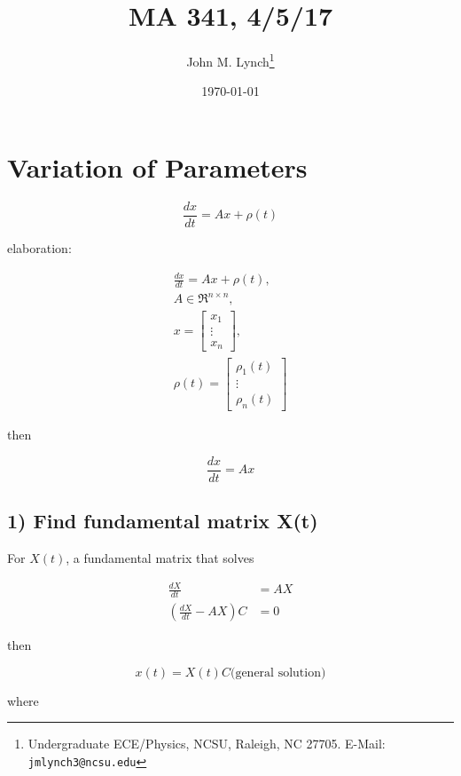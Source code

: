 \documentclass[twocolumn,draft]{article}
\title{MA 341, 4/5/17}
\author{John M. Lynch\footnote{Undergraduate ECE/Physics, NCSU, Raleigh, NC 27705. E-Mail: \texttt{jmlynch3@ncsu.edu}}}
\date{\today}
\begin{document}
  \maketitle
  
  \section*{Variation of Parameters}
  
  \begin{equation}
  	\frac{dx}{dt} = Ax + \rho(t)
  \end{equation}
  
  elaboration:
  
  \begin{align*}
  	\frac{dx}{dt} = Ax + \rho(t), \\
	A\in\Re^{n\times n}, \\
	x = \begin{bmatrix}
		x_{1} \\
		\vdots \\
		x_{n}
	\end{bmatrix}, \\
	\rho(t) = \begin{bmatrix}
				\rho_{1}(t) \\
				\vdots \\
				\rho_{n}(t)
			  \end{bmatrix}
  \end{align*}
  
  then
  
  \begin{equation}
  	\frac{dx}{dt} = Ax
  \end{equation}
  
  \subsection*{1) Find fundamental matrix X(t)} For $X(t)$, a fundamental matrix that solves
  
  \begin{align}
  	\frac{dX}{dt} &= AX \\
	(\frac{dX}{dt} - AX)C &= 0
  \end{align}
  
  then
  
  \begin{equation}
  	x(t) = X(t)C \text{(general solution)}
  \end{equation}
  
  where
  
\end{document}
